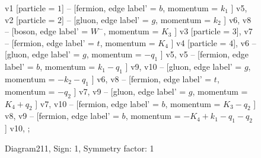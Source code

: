 \documentclass{revtex4}
\begin{document}
\begin{figure}[!htb]
\begin{center}
{    %
v1 [particle = \(1\)] -- [fermion, edge label' = \(b\), momentum = \(k_{1}\) ] v5, 
v2 [particle = \(2\)] -- [gluon, edge label' = \(g\), momentum = \(k_{2}\) ] v6, 
v8 -- [boson, edge label' = \(W^{-}\), momentum = \(K_{3}\) ] v3 [particle = \(3\)], 
v7 -- [fermion, edge label' = \(t\), momentum = \(K_{4}\) ] v4 [particle = \(4\)], 
v6 -- [gluon, edge label' = \(g\), momentum = \(-q_{1}\) ] v5, 
v5 -- [fermion, edge label' = \(b\), momentum = \(k_{1} - q_{1}\) ] v9, 
v10 -- [gluon, edge label' = \(g\), momentum = \(-k_{2} - q_{1}\) ] v6, 
v8 -- [fermion, edge label' = \(t\), momentum = \(-q_{2}\) ] v7, 
v9 -- [gluon, edge label' = \(g\), momentum = \(K_{4} + q_{2}\) ] v7, 
v10 -- [fermion, edge label' = \(b\), momentum = \(K_{3} - q_{2}\) ] v8, 
v9 -- [fermion, edge label' = \(b\), momentum = \(-K_{4} + k_{1} - q_{1} - q_{2}\) ] v10, 
};
\end{center}
\caption{Diagram211, Sign: 1, Symmetry factor: 1}
\end{figure}
\newpage
\end{document}

